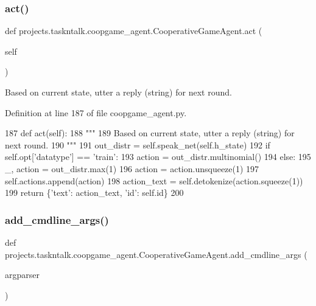\subsubsection{\texorpdfstring{act()}{act()}}
{\footnotesize\ttfamily def projects.\+taskntalk.\+coopgame\+\_\+agent.\+Cooperative\+Game\+Agent.\+act (\begin{DoxyParamCaption}\item[{}]{self }\end{DoxyParamCaption})}

\begin{DoxyVerb}Based on current state, utter a reply (string) for next round.
\end{DoxyVerb}
 

Definition at line 187 of file coopgame\+\_\+agent.\+py.


\begin{DoxyCode}
187     \textcolor{keyword}{def }act(self):
188         \textcolor{stringliteral}{"""}
189 \textcolor{stringliteral}{        Based on current state, utter a reply (string) for next round.}
190 \textcolor{stringliteral}{        """}
191         out\_distr = self.speak\_net(self.h\_state)
192         \textcolor{keywordflow}{if} self.opt[\textcolor{stringliteral}{'datatype'}] == \textcolor{stringliteral}{'train'}:
193             action = out\_distr.multinomial()
194         \textcolor{keywordflow}{else}:
195             \_, action = out\_distr.max(1)
196             action = action.unsqueeze(1)
197         self.actions.append(action)
198         action\_text = self.detokenize(action.squeeze(1))
199         \textcolor{keywordflow}{return} \{\textcolor{stringliteral}{'text'}: action\_text, \textcolor{stringliteral}{'id'}: self.id\}
200 
\end{DoxyCode}
\mbox{\label{classprojects_1_1taskntalk_1_1coopgame__agent_1_1CooperativeGameAgent_af06b68508ab556b36c19c9378ce1f63e}} 
\subsubsection{\texorpdfstring{add\+\_\+cmdline\+\_\+args()}{add\_cmdline\_args()}}
{\footnotesize\ttfamily def projects.\+taskntalk.\+coopgame\+\_\+agent.\+Cooperative\+Game\+Agent.\+add\+\_\+cmdline\+\_\+args (\begin{DoxyParamCaption}\item[{}]{argparser }\end{DoxyParamCaption})\hspace{0.3cm}{\ttfamily [static]}}

